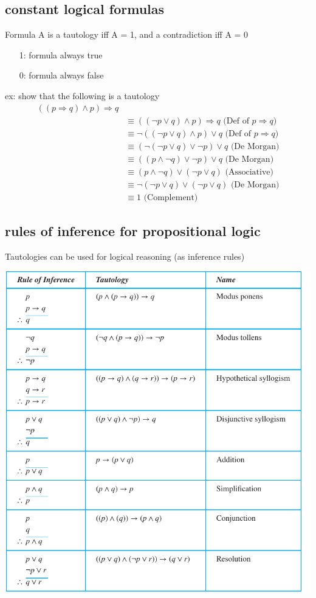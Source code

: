 \documentclass{article}
\begin{document}
\subsection{constant logical formulas}
Formula A is a tautology iff A = 1, and a contradiction iff A = 0
\begin{itemize}
    \item [1:] formula always true
    \item [0:] formula always false
\end{itemize}
ex: show that the following is a tautology
\begin{align*}
    ((p \Rightarrow  q) \land p) \Rightarrow q
    \\ & \equiv ((\lnot p \lor  q) \land p) \Rightarrow q \text{ (Def of $p \Rightarrow  q$)}
    \\ & \equiv \lnot ((\lnot p \lor  q) \land p) \lor q \text{ (Def of $p \Rightarrow  q$)}
    \\ & \equiv (\lnot(\lnot p \lor  q) \lor \lnot p) \lor q \text{ (De Morgan)}
    \\ & \equiv ((p \land \lnot q) \lor \lnot p) \lor q \text{ (De Morgan)}
    \\ & \equiv (p \land \lnot q) \lor (\lnot p \lor q) \text{ (Associative)}
    \\ & \equiv \lnot(\lnot p \lor q) \lor (\lnot p \lor q) \text{ (De Morgan)}
    \\ & \equiv 1 \text{ (Complement)}
\end{align*}

\subsection{rules of inference for propositional logic}
Tautologies can be used for logical reasoning (as inference rules)

\includegraphics[width=0.9\columnwidth,keepaspectratio]{l4_2}
\pagebreak
\end{document}
